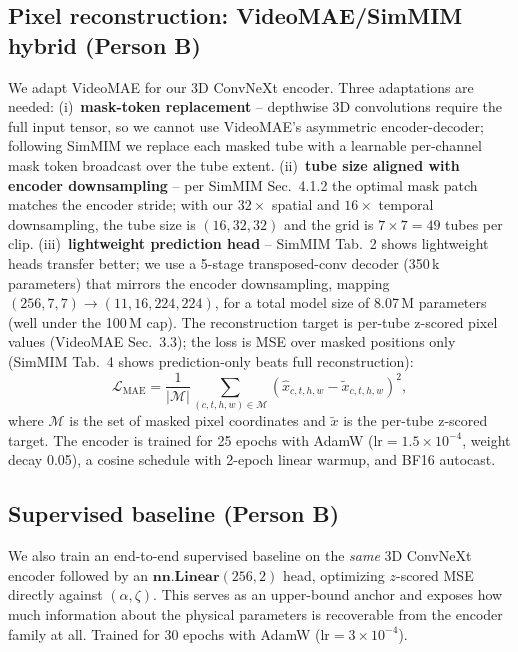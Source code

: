 \documentclass{article}
\begin{document}
\subsection{Pixel reconstruction: VideoMAE/SimMIM hybrid (Person B)}
\label{sec:method-pixel}
We adapt VideoMAE \citep{tong2022videomae} for our 3D ConvNeXt encoder. Three
adaptations are needed: (i)~\textbf{mask-token replacement} -- depthwise 3D
convolutions require the full input tensor, so we cannot use VideoMAE's
asymmetric encoder-decoder; following SimMIM \citep{xie2022simmim} we replace
each masked tube with a learnable per-channel mask token broadcast over the
tube extent. (ii)~\textbf{tube size aligned with encoder downsampling} -- per
SimMIM Sec.~4.1.2 the optimal mask patch matches the encoder stride; with our
$32{\times}$ spatial and $16{\times}$ temporal downsampling, the tube size is
$(16, 32, 32)$ and the grid is $7{\times}7=49$ tubes per clip.
(iii)~\textbf{lightweight prediction head} -- SimMIM Tab.~2 shows lightweight
heads transfer better; we use a 5-stage transposed-conv decoder (350\,k
parameters) that mirrors the encoder downsampling, mapping $(256, 7, 7) \to
(11, 16, 224, 224)$, for a total model size of 8.07\,M parameters (well under
the 100\,M cap). The reconstruction target is per-tube z-scored pixel values
(VideoMAE Sec.~3.3); the loss is MSE over masked positions only (SimMIM
Tab.~4 shows prediction-only beats full reconstruction):
\begin{equation}
\mathcal{L}_{\text{MAE}} = \frac{1}{|\mathcal{M}|}
    \sum_{(c,t,h,w) \in \mathcal{M}}
    \left( \hat{x}_{c,t,h,w} - \tilde{x}_{c,t,h,w} \right)^2,
\end{equation}
where $\mathcal{M}$ is the set of masked pixel coordinates and $\tilde{x}$ is
the per-tube z-scored target. The encoder is trained for 25 epochs with AdamW
($\text{lr}=1.5{\times}10^{-4}$, weight decay 0.05), a cosine schedule with
2-epoch linear warmup, and BF16 autocast.

\subsection{Supervised baseline (Person B)}
\label{sec:method-supervised}
We also train an end-to-end supervised baseline on the \emph{same} 3D ConvNeXt
encoder followed by an $\mathbf{nn.Linear}(256, 2)$ head, optimizing $z$-scored
MSE directly against $(\alpha, \zeta)$. This serves as an upper-bound anchor
and exposes how much information about the physical parameters is recoverable
from the encoder family at all. Trained for 30 epochs with AdamW
($\text{lr}=3{\times}10^{-4}$).
\end{document}
